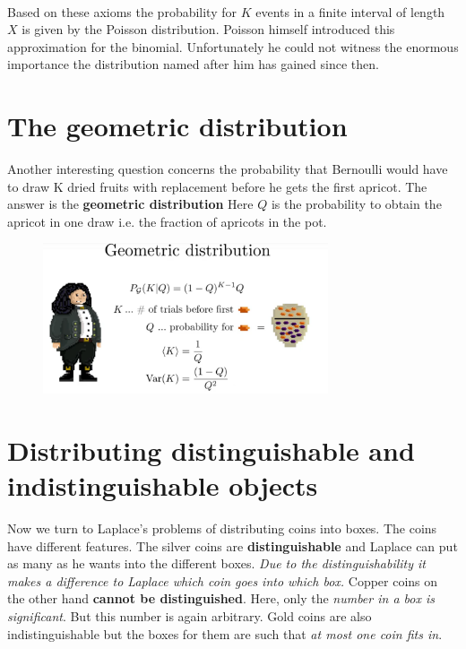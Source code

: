 \documentclass[12pt, a4paper]{scrartcl}
\begin{document}
\\
       
Based on these axioms the probability for $K$ events in a finite interval of length $X$ is given by the Poisson distribution.
Poisson himself introduced this approximation for the binomial. Unfortunately he could not witness the enormous importance the distribution named after him has gained since then.\\


\section*{The geometric distribution}
Another interesting question concerns the probability that Bernoulli would have to draw K dried fruits with replacement before he gets the first apricot. The answer is the \textbf{geometric distribution}
Here $Q$ is the probability to obtain the apricot in one draw i.e. the fraction of apricots in the pot.\\
 \begin{figure}[H]
	\centering
	\includegraphics[width=0.75\textwidth]{4_11.png}
\end{figure}

\section{Distributing distinguishable and indistinguishable objects}
Now we turn to Laplace’s problems of distributing coins into boxes.
The coins have different features. The silver coins are \textbf{distinguishable}
and Laplace can put as many as he wants into the different boxes.
\textit{Due to the distinguishability it makes a difference to Laplace which coin goes into which box. }
Copper coins on the other hand \textbf{cannot be distinguished}. Here, only the \textit{number in a box is significant}. But this number is again arbitrary.
Gold coins are also indistinguishable but the boxes for them are such that \textit{at most one coin fits in}.\\
\end{document}
